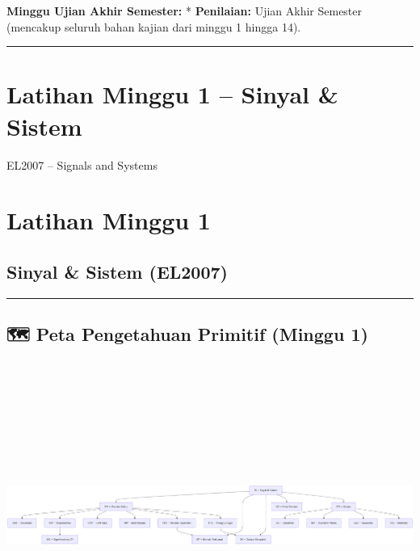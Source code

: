 \documentclass[
  letterpaper,
  DIV=11,
  numbers=noendperiod]{scrreprt}
\begin{document}
\textbf{Minggu Ujian Akhir Semester:} * \textbf{Penilaian:} Ujian Akhir
Semester (mencakup seluruh bahan kajian dari minggu 1 hingga 14).

\begin{center}\rule{0.5\linewidth}{0.5pt}\end{center}


\chapter{Latihan Minggu 1 -- Sinyal \&
Sistem}\label{latihan-minggu-1-sinyal-sistem}

EL2007 -- Signals and Systems

\hfill\break


\chapter{Latihan Minggu 1}\label{latihan-minggu-1}

\section{Sinyal \& Sistem (EL2007)}\label{sinyal-sistem-el2007}

\begin{center}\rule{0.5\linewidth}{0.5pt}\end{center}

\section{🗺️ Peta Pengetahuan Primitif (Minggu
1)}\label{peta-pengetahuan-primitif-minggu-1}

\includegraphics[width=27.12in,height=3.98in]{kuliah/Peta_1_files/figure-latex/mermaid-figure-1.png}
\end{document}
